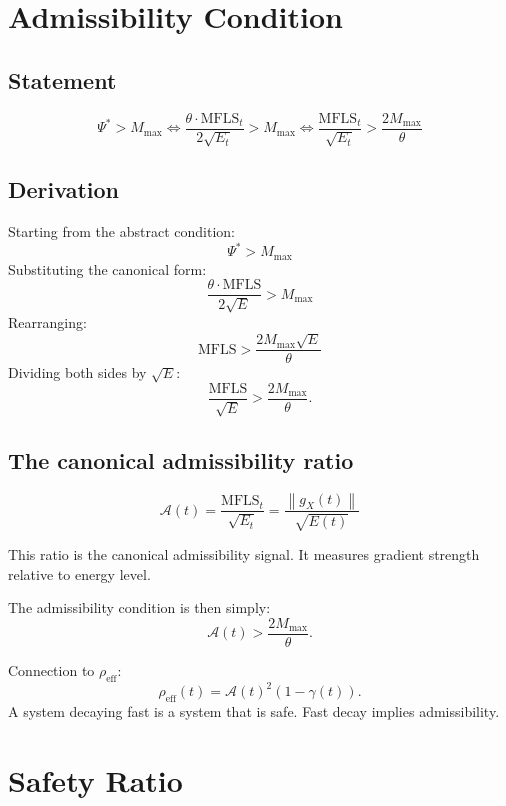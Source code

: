 \documentclass[11pt,a4paper]{article}
\theoremstyle{definition}
\newcommand{\norm}[1]{\left\|#1\right\|}
\newcommand{\gX}{g_X}
\newcommand{\mfls}{\mathrm{MFLS}}
\begin{document}
\section{Admissibility Condition}

\subsection{Statement}

\begin{lockedbox}
\[
\Psi^* > M_\mathrm{max} \iff \frac{\theta\cdot\mfls_t}{2\sqrt{E_t}} > M_\mathrm{max}
\iff \frac{\mfls_t}{\sqrt{E_t}} > \frac{2M_\mathrm{max}}{\theta}
\]
\end{lockedbox}

\subsection{Derivation}

Starting from the abstract condition:
\[
\Psi^* > M_\mathrm{max}
\]
Substituting the canonical form:
\[
\frac{\theta\cdot\mfls}{2\sqrt{E}} > M_\mathrm{max}
\]
Rearranging:
\[
\mfls > \frac{2M_\mathrm{max}\sqrt{E}}{\theta}
\]
Dividing both sides by $\sqrt{E}$:
\[
\frac{\mfls}{\sqrt{E}} > \frac{2M_\mathrm{max}}{\theta}.
\]

\subsection{The canonical admissibility ratio}

\begin{lockedbox}
\[
\mathcal{A}(t) = \frac{\mfls_t}{\sqrt{E_t}} = \frac{\norm{\gX(t)}}{\sqrt{E(t)}}
\]
\end{lockedbox}

This ratio is the canonical admissibility signal. It measures gradient strength relative to energy level.

The admissibility condition is then simply:
\[
\mathcal{A}(t) > \frac{2M_\mathrm{max}}{\theta}.
\]

Connection to $\rho_\mathrm{eff}$:
\[
\rho_\mathrm{eff}(t) = \mathcal{A}(t)^2(1-\gamma(t)).
\]
A system decaying fast is a system that is safe. Fast decay implies admissibility.

\section{Safety Ratio}
\end{document}
